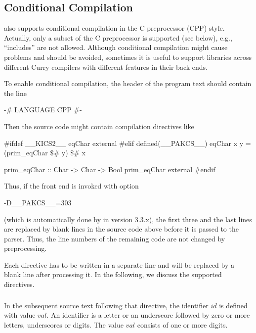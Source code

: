 \subsection{Conditional Compilation}

\CYS also supports conditional compilation
in the C preprocessor (CPP) style.
Actually, only a subset of the C preprocessor is supported (see below),
e.g., ``includes'' are not allowed.
Although conditional compilation might cause problems
and should be avoided, sometimes it is useful to support libraries
across different Curry compilers with different features
in their back ends.

To enable conditional compilation, the header of the program text
should contain the line
%
\begin{curry}
{-# LANGUAGE CPP #-}
\end{curry}
%
Then the source code might contain compilation directives like
%
\begin{curry}
#ifdef __KICS2__
eqChar external
#elif defined(__PAKCS__)
eqChar x y = (prim_eqChar $\$$# y) $\$$# x

prim_eqChar :: Char -> Char -> Bool
prim_eqChar external
#endif
\end{curry}
%
Thus, if the front end is invoked with option
\begin{curry}
-D__PAKCS__=303
\end{curry}
(which is automatically done by \CYS in version 3.3.x),
the first three and the last lines are replaced by blank lines
in the source code above before it is passed to the parser.
Thus, the line numbers of the remaining code are not changed
by preprocessing.

Each directive has to be written in a separate line and will
be replaced by a blank line after processing it.
In the following, we discuss the supported directives.

\subsubsection*{}

In the subsequent source text following that directive,
the identifier $\mathit{id}$ is defined with value $\mathit{val}$.
An identifier is a letter or an underscore followed by zero or more letters,
underscores or digits.
The value $\mathit{val}$ consists of one or more digits.

\subsubsection*{}

